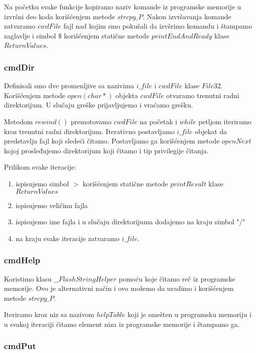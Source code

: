 \documentclass[a4paper]{extarticle}
\begin{document}
	Na početku svake funkcije kopiramo naziv komande iz programske memorije u izvršni deo koda korišćenjem metode $strcpy\_P$. 
	Nakon izvršavanja komande zatvaramo $cwdFile$ fajl nad kojim smo pokušali da izvšrimo komandu i štampamo zaglavlje i simbol $\$$ korišćenjem statične metode $printEndAndReady$ klase $ReturnValues$. 
	
	\subsubsection{cmdDir}
	
	Definisali smo dve promenljive sa nazivima $i\_file$ i $cwdFile$ klase $File32$.
	Korišćenjem metode $open(char*)$ objekta $cwdFile$ otvaramo trenutni radni direktorijum. U slučaju greške prijavljujemo i vraćamo grešku.
	
	Metodom $rewind()$ premotovamo $cwdFile$ na početak i $while$ petljom iteriramo kroz trenutni radni direktorijum. Iterativno postavljamo $i\_file$ objekat da predstavlja fajl koji sledeći čitamo. Postavljamo ga korišćenjem metode $openNext$ kojoj prosleđujemo direktorijum koji čitamo i tip privilegije čitanja.
	
	Prilikom svake iteracije:
	\begin{enumerate}
		\item ispisujemo simbol $>$ korišćenjem statične metode $printResult$ klase $ReturnValues$
		\item ispisujemo veličinu fajla
		\item ispisujemo ime fajla i u slučaju direktorijuma dodajemo na kraju simbol "/"
		\item na kraju svake iteracije zatvaramo $i\_file$.
	\end{enumerate}

	\subsubsection{cmdHelp}
	
	Koristimo klasu $\_\_FlashStringHelper$ pomoću koje čitamo reč iz programske memorije. Ovo je alternativni način i ovo možemo da uradimo i korišćenjem metode $strcpy\_P$.
	
	Iteriramo kroz niz sa nazivom $helpTable$ koji je smešten u programsku memoriju i u svakoj iteraciji čitamo element niza iz programske memorije i štampamo ga.
	
	\subsubsection{cmdPut}
	
\end{document}
